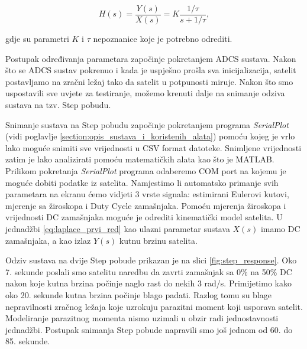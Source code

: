 \documentclass[times, utf8, diplomski, numeric]{templates/template}
\begin{document}
{{{            \begin{equation}
                H(s) = \frac{Y(s)}{X(s)} = K \frac{1/\tau}{s + 1/\tau},
            \end{equation}

            gdje su parametri $K$ i $\tau$ nepoznanice koje je potrebno odrediti. 

            Postupak određivanja parametara započinje pokretanjem ADCS sustava. Nakon što se ADCS sustav pokrenuo i kada je uspješno prošla sva inicijalizacija, satelit postavljamo na zračni ležaj tako da satelit u potpunosti miruje. Nakon što smo uspostavili sve uvjete za testiranje, možemo krenuti dalje na snimanje odziva sustava na tzv. Step pobudu.

            Snimanje sustava na Step pobudu započinje pokretanjem programa \emph{SerialPlot} (vidi poglavlje \ref{section:opis_sustava_i_koristenih_alata}) pomoću kojeg je vrlo lako moguće snimiti sve vrijednosti u CSV format datoteke. Snimljene vrijednosti zatim je lako analizirati pomoću matematičkih alata kao što je MATLAB. Prilikom pokretanja \emph{SerialPlot} programa odaberemo COM port na kojemu je moguće dobiti podatke iz satelita. Namjestimo li automatsko primanje svih parametara na ekranu ćemo vidjeti 3 vrste signala: estimirani Eulerovi kutovi, mjerenje sa žiroskopa i Duty Cycle zamašnjaka. Pomoću mjerenja žiroskopa i vrijednosti DC zamašnjaka moguće je odrediti kinematički model satelita. U jednadžbi \ref{eq:laplace_prvi_red} kao ulazni parametar sustava $X(s)$ imamo DC zamašnjaka, a kao izlaz $Y(s)$ kutnu brzinu satelita. 

            Odziv sustava na dvije Step pobude prikazan je na slici \ref{fig:step_response}. Oko 7. sekunde poslali smo satelitu naredbu da zavrti zamašnjak sa 0\% na 50\% DC nakon koje kutna brzina počinje naglo rast do nekih 3 rad/s. Primijetimo kako oko 20. sekunde kutna brzina počinje blago padati. Razlog tomu su blage nepravilnosti zračnog ležaja koje uzrokuju parazitni moment koji usporava satelit. Modeliranje parazitnog momenta nismo uzimali u obzir radi jednostavnosti jednadžbi. Postupak snimanja Step pobude napravili smo još jednom od 60. do 85. sekunde.

}}}
\end{document}

